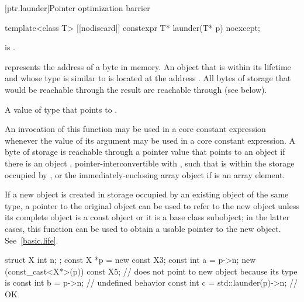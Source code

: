 [ptr.launder]{Pointer optimization barrier}

%
\begin{itemdecl}
template<class T> [[nodiscard]] constexpr T* launder(T* p) noexcept;
\end{itemdecl}

\begin{itemdescr}
\pnum
\mandates
{} is .

\pnum
\expects
{} represents the address  of a byte in memory.
An object  that is within its lifetime
and whose type is similar to 
is located at the address .
All bytes of storage that would be reachable through the result
are reachable through  (see below).

\pnum
\returns
A value of type  that points to .

\pnum
\remarks
An invocation of this function
may be used in a core constant expression
whenever the value of its argument
may be used in a core constant expression.
A byte of storage  is
reachable through a pointer value
that points to an object 
if there is an object ,
pointer-interconvertible with ,
such that  is within the storage occupied by
, or
the immediately-enclosing array object if  is an array element.

\pnum
\begin{note}
If a new object is created
in storage occupied by an existing object of the same type,
a pointer to the original object
can be used to refer to the new object
unless its complete object is a const object or it is a base class subobject;
in the latter cases,
this function can be used to obtain a usable pointer to the new object.
See~\ref{basic.life}.
\end{note}

\pnum
\begin{example}
\begin{codeblock}
struct X { int n; };
const X *p = new const X{3};
const int a = p->n;
new (const_cast<X*>(p)) const X{5}; //  does not point to new object because its type is 
const int b = p->n;                 // undefined behavior
const int c = std::launder(p)->n;   // OK
\end{codeblock}
\end{example}
\end{itemdescr}

